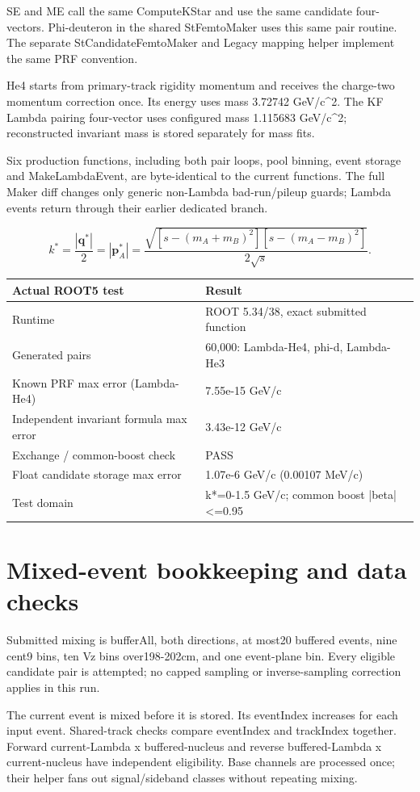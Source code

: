 \documentclass[10pt,a4paper]{article}
\begin{document}
SE and ME call the same ComputeKStar and use the same candidate four-vectors. Phi-deuteron in the shared StFemtoMaker uses this same pair routine. The separate StCandidateFemtoMaker and Legacy mapping helper implement the same PRF convention.

He4 starts from primary-track rigidity momentum and receives the charge-two momentum correction once. Its energy uses mass 3.72742 GeV/c\textasciicircum{}2. The KF Lambda pairing four-vector uses configured mass 1.115683 GeV/c\textasciicircum{}2; reconstructed invariant mass is stored separately for mass fits.

Six production functions, including both pair loops, pool binning, event storage and MakeLambdaEvent, are byte-identical to the current functions. The full Maker diff changes only generic non-Lambda bad-run/pileup guards; Lambda events return through their earlier dedicated branch.

\[k^*=\frac{|\boldsymbol q^*|}{2}=|\boldsymbol p_A^*|=\frac{\sqrt{[s-(m_A+m_B)^2][s-(m_A-m_B)^2]}}{2\sqrt{s}}.\]
{\small\setlength{\tabcolsep}{3pt}\begin{longtable}{ll}\toprule
Actual ROOT5 test & Result\\\midrule\endhead
Runtime & ROOT 5.34/38, exact submitted function\\
Generated pairs & 60,000: Lambda-He4, phi-d, Lambda-He3\\
Known PRF max error (Lambda-He4) & 7.55e-15 GeV/c\\
Independent invariant formula max error & 3.43e-12 GeV/c\\
Exchange / common-boost check & PASS\\
Float candidate storage max error & 1.07e-6 GeV/c (0.00107 MeV/c)\\
Test domain & k*=0-1.5 GeV/c; common boost |beta|<=0.95\\
\bottomrule\end{longtable}}
\clearpage
\section*{Mixed-event bookkeeping and data checks}
Submitted mixing is bufferAll, both directions, at most20 buffered events, nine cent9 bins, ten Vz bins over198-202cm, and one event-plane bin. Every eligible candidate pair is attempted; no capped sampling or inverse-sampling correction applies in this run.

The current event is mixed before it is stored. Its eventIndex increases for each input event. Shared-track checks compare eventIndex and trackIndex together. Forward current-Lambda x buffered-nucleus and reverse buffered-Lambda x current-nucleus have independent eligibility. Base channels are processed once; their helper fans out signal/sideband classes without repeating mixing.
\end{document}

